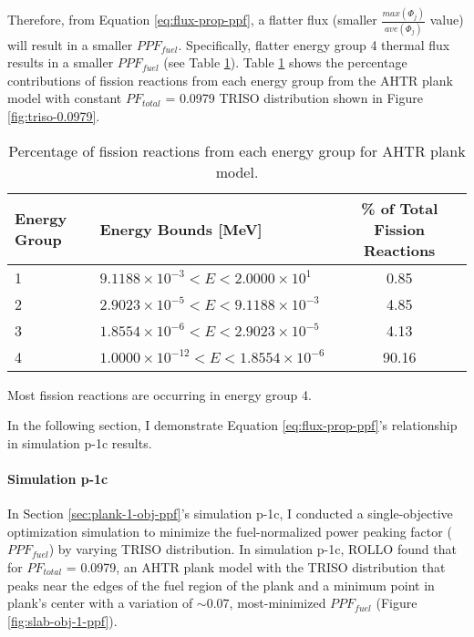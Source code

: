 Therefore, from Equation \ref{eq:flux-prop-ppf}, a flatter flux (smaller 
$\frac{max(\Phi_j)}{ave(\Phi_j)}$ value) will result in a smaller $PPF_{fuel}$. 
Specifically, flatter energy group 4 thermal flux results in a smaller $PPF_{fuel}$
(see Table \ref{tab:fission-flux}). 
Table \ref{tab:fission-flux} shows the percentage contributions of fission reactions from 
each energy group from the \gls{AHTR} plank model with constant $PF_{total}$ = 0.0979 
TRISO distribution shown in Figure \ref{fig:triso-0.0979}. 
\begin{table}[htbp!]
    \centering
    \onehalfspacing
    \caption{Percentage of fission reactions from each energy group for \gls{AHTR} 
    plank model.}
	\label{tab:fission-flux}
    \footnotesize
    \begin{tabular}{llc}
    \hline 
    \textbf{Energy Group} & \textbf{Energy Bounds [MeV]} 
    & \textbf{\% of Total Fission \newline Reactions} \\
    \hline
    1 & $9.1188\times 10^{-3} < E < 2.0000\times 10^1$ & 0.85 \\ 
    2 & $2.9023\times 10^{-5} < E < 9.1188\times 10^{-3}$ & 4.85 \\
    3 & $1.8554\times 10^{-6} < E < 2.9023\times 10^{-5}$ & 4.13 \\
    4 & $1.0000\times 10^{-12} < E < 1.8554\times 10^{-6}$ & 90.16 \\
    \hline
    \end{tabular}
\end{table}
Most fission reactions are occurring in energy group 4. 

In the following section, I demonstrate Equation \ref{eq:flux-prop-ppf}'s relationship 
in simulation p-1c results. 

\paragraph{Simulation p-1c}
In Section \ref{sec:plank-1-obj-ppf}'s simulation p-1c, I conducted a single-objective 
optimization simulation to minimize the fuel-normalized power peaking factor ($PPF_{fuel}$) 
by varying TRISO distribution. 
In simulation p-1c, \gls{ROLLO} found that for $PF_{total}$ = 0.0979, an \gls{AHTR} 
plank model with the TRISO distribution that peaks near the edges of the fuel region of 
the plank and a minimum point in plank's center with a variation of ${\sim}0.07$, 
most-minimized $PPF_{fuel}$ (Figure \ref{fig:slab-obj-1-ppf}). 

